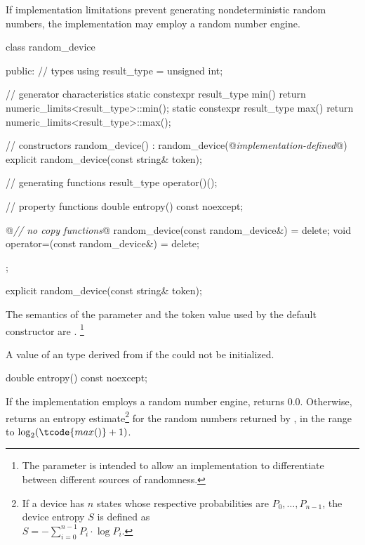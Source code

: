\pnum
If implementation limitations%
prevent generating nondeterministic random numbers,
the implementation may employ a random number engine.

%
%
\begin{codeblock}
class random_device {
public:
  // types
  using result_type = unsigned int;

  // generator characteristics
  static constexpr result_type min() { return numeric_limits<result_type>::min(); }
  static constexpr result_type max() { return numeric_limits<result_type>::max(); }

  // constructors
  random_device() : random_device(@\textit{implementation-defined}@) {}
  explicit random_device(const string& token);

  // generating functions
  result_type operator()();

  // property functions
  double entropy() const noexcept;

  @\textit{// no copy functions}@
  random_device(const random_device&) = delete;
  void operator=(const random_device&) = delete;
};
\end{codeblock}


%
\begin{itemdecl}
explicit random_device(const string& token);
\end{itemdecl}

\begin{itemdescr}
\pnum
\remarks
 The semantics of the  parameter
 and the token value used by the default constructor are
 .%
\footnote{The parameter is intended
   to allow an implementation to differentiate
   between different sources of randomness.}

\pnum
\throws
A value of an  type
 derived from 
 if the  could not be initialized.
\end{itemdescr}

%
\begin{itemdecl}
double entropy() const noexcept;
\end{itemdecl}

\begin{itemdescr}
\pnum
\returns
If the implementation employs a random number engine,
 returns $0.0$.
 Otherwise, returns an entropy estimate\footnote{If a device has $n$ states
   whose respective probabilities are
   $P_0, \dotsc, P_{n-1}$,
   the device entropy $S$ is defined as\\
   $S = - \sum_{i=0}^{n-1} P_i \cdot \log P_i$.}
 for the random numbers returned by ,
 in the range
 to
   $\log_2( \tcode{max()}+1)$.
\end{itemdescr}


